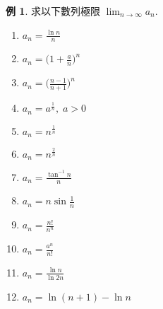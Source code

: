 \documentclass[12pt]{extarticle}
\newcommand{\ds}{\displaystyle}
\theoremstyle{definition}
\newtheorem*{ex}{例}
\begin{document}
\begin{ex}
  求以下數列極限 $\ds\lim_{n\to\infty}a_n$. 
  \begin{multicols}{4}
    \begin{enumerate}\setlength\itemsep{0em}
      \item $\ds a_n = \frac{\ln n}{n}$
      \item $\ds a_n = \Big(1 + \frac{a}{n}\Big)^n$
      \item $\ds a_n = \Big(\frac{n - 1}{n + 1}\Big)^n$
      \item $\ds a_n = a^{\frac{1}{n}},\;a > 0$
      \item $\ds a_n = n^{\frac{1}{n}}$
      \item $\ds a_n = n^{\frac{2}{n}}$
      \item $\ds a_n = \frac{\tan^{-1} n}{n}$
      \item $\ds a_n = n\sin\frac{1}{n}$
      \item $\ds a_n = \frac{n!}{n^n}$
      \item $\ds a_n = \frac{a^n}{n!}$
      \item $\ds a_n = \frac{\ln n}{\ln 2n}$
      \item $\ds a_n = \ln(n + 1) - \ln n$
    \end{enumerate}
  \end{multicols}
\end{ex}
\end{document}
